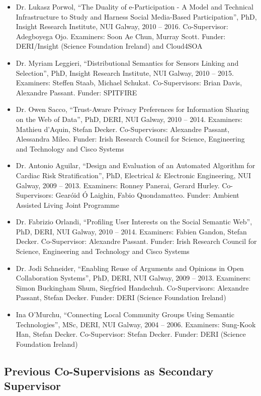 \documentclass[10pt,a4paper]{res} %
\begin{document}
\begin{resume}
\begin{itemize}
\item Dr. Lukasz Porwol, ``The Duality of e-Participation - A Model and Technical Infrastructure to Study and Harness Social Media-Based Participation'', PhD, Insight Research Institute, NUI Galway, 2010 -- 2016. Co-Supervisor: Adegboyega Ojo. Examiners: Soon Ae Chun, Murray Scott. Funder: DERI/Insight (Science Foundation Ireland) and Cloud4SOA
\item Dr. Myriam Leggieri, ``Distributional Semantics for Sensors Linking and Selection'', PhD, Insight Research Institute, NUI Galway, 2010 -- 2015. Examiners: Steffen Staab, Michael Schukat. Co-Supervisors: Brian Davis, Alexandre Passant. Funder: SPITFIRE %
\item Dr. Owen Sacco, ``Trust-Aware Privacy Preferences for Information Sharing on the Web of Data'', PhD, DERI, NUI Galway, 2010 -- 2014. Examiners: Mathieu d'Aquin, Stefan Decker. Co-Supervisors: Alexandre Passant, Alessandra Mileo. Funder: Irish Research Council for Science, Engineering and Technology and Cisco Systems %
\item Dr. Antonio Aguilar, ``Design and Evaluation of an Automated Algorithm for Cardiac Risk Stratification'', PhD, Electrical \& Electronic Engineering, NUI Galway, 2009 -- 2013. Examiners: Ronney Panerai, Gerard Hurley. Co-Supervisors: Gear\'{o}id \'{O} Laighin, Fabio Quondamatteo. Funder: Ambient Assisted Living Joint Programme %
\item Dr. Fabrizio Orlandi, ``Profiling User Interests on the Social Semantic Web'', PhD, DERI, NUI Galway, 2010 -- 2014. Examiners: Fabien Gandon, Stefan Decker. Co-Supervisor: Alexandre Passant. Funder: Irish Research Council for Science, Engineering and Technology and Cisco Systems %
\item Dr. Jodi Schneider, ``Enabling Reuse of Arguments and Opinions in Open Collaboration Systems'', PhD, DERI, NUI Galway, 2009 -- 2013. Examiners: Simon Buckingham Shum, Siegfried Handschuh. Co-Supervisors: Alexandre Passant, Stefan Decker. Funder: DERI (Science Foundation Ireland) %
\item Ina O'Murchu, ``Connecting Local Community Groups Using Semantic Technologies'', MSc, DERI, NUI Galway, 2004 -- 2006. Examiners: Sung-Kook Han, Stefan Decker. Co-Supervisor: Stefan Decker. Funder: DERI (Science Foundation Ireland)
\end{itemize}

\subsection*{Previous Co-Supervisions as Secondary Supervisor}


\end{resume}
\end{document}
